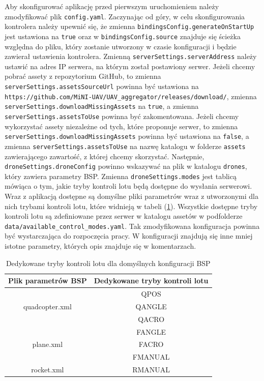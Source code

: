 \documentclass[15pt]{sprawozdanie}
\begin{document}
Aby skonfigurować aplikację przed pierwszym uruchomieniem należy zmodyfikować plik \texttt{config.yaml}. Zaczynając od góry, w celu skonfigurowania kontrolera należy upewnić się, że zmienna \texttt{bindingsConfig.generateOnStartUp} jest ustawiona na \texttt{true} oraz w \texttt{bindingsConfig.source} znajduje się ścieżka względna do pliku, który zostanie utworzony w czasie konfiguracji i będzie zawierał ustawienia kontrolera. Zmienną \texttt{serverSettings.serverAddress} należy ustawić na adres IP serwera, na którym został postawiony serwer. Jeżeli chcemy pobrać assety z repozytorium GitHub, to zmienna \\ \texttt{serverSettings.assetsSourceUrl} powinna być ustawiona na \\ \texttt{https://github.com/MiNI-UAV/UAV\_aggregator/releases/download/}, zmienna \\ \texttt{serverSettings.downloadMissingAssets} na \texttt{true}, a zmienna \texttt{serverSettings.assetsToUse} powinna być zakomentowana. Jeżeli chcemy wykorzystać assety niezależne od tych, które proponuje serwer, to zmienna \texttt{serverSettings.downloadMissingAssets} powinna być ustawiona na  \texttt{false}, a zmienna \texttt{serverSettings.assetsToUse} na nazwę katalogu w folderze \texttt{assets} zawierającego zawartość, z której chcemy skorzystać. Następnie, \texttt{droneSettings.droneConfig} powinno wskazywać na plik w katalogu \texttt{drones}, który zawiera parametry BSP. Zmienna \texttt{droneSettings.modes} jest tablicą mówiąca o tym, jakie tryby kontroli lotu będą dostępne do wysłania serwerowi. Wraz z aplikacją dostępne są domyślne pliki parametrów wraz z utworzonymi dla nich trybami kontroli lotu, które widnieją w tabeli (\ref{modesTable}). Wszystkie dostępne tryby kontroli lotu są zdefiniowane przez serwer w katalogu assetów w podfolderze \texttt{data/available\_control\_modes.yaml}. Tak zmodyfikowana konfiguracja powinna być wystarczająca do rozpoczęcia pracy. W konfiguracji znajdują się inne mniej istotne parametry, których opis znajduje się w komentarzach.

\begin{table}[!ht]	
	\begin{center}
		\begin{tabular}{ |c|c| } 
			\hline
			Plik parametrów BSP & Dedykowane tryby kontroli lotu \\
			\hline
			\multirow{3}{7em}{quadcopter.xml} 
			& QPOS \\ & QANGLE \\ & QACRO \\
			\hline
			\multirow{3}{5em}{{plane.xml}} 
			& FANGLE \\ & FACRO \\ & FMANUAL \\
			\hline
			\multirow{1}{5em}{{rocket.xml}} 
			& RMANUAL \\
			\hline
		\end{tabular}
		\caption{Dedykowane tryby kontroli lotu dla domyślnych konfiguracji BSP}
		\label{modesTable}
	\end{center}
\end{table}
\end{document}
